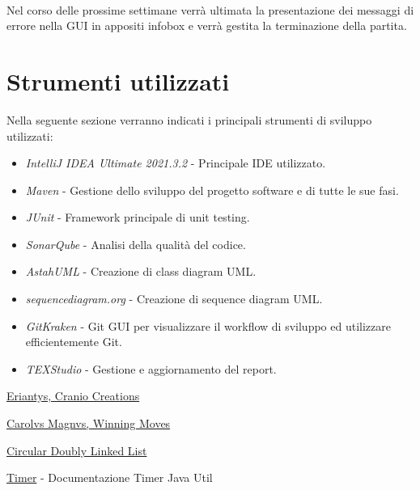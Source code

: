 \documentclass[a4paper, 12pt]{article}
\begin{document}
	\paragraph{}
	Nel corso delle prossime settimane verrà ultimata la presentazione dei messaggi di errore nella GUI in appositi infobox e verrà gestita la terminazione della partita.
	\newpage
	\section{Strumenti utilizzati}
	Nella seguente sezione verranno indicati i principali strumenti di sviluppo utilizzati:\\
	\begin{itemize}
		\setlength{\parskip}{0pt}
		\setlength{\parsep}{0pt}
		
		\item \emph{IntelliJ IDEA Ultimate 2021.3.2} - Principale IDE utilizzato.
		\item \emph{Maven} - Gestione dello sviluppo del progetto software e di tutte le sue fasi.
		\item \emph{JUnit} - Framework principale di unit testing.
		\item \emph{SonarQube} - Analisi della qualità del codice.
		\item \emph{AstahUML} - Creazione di class diagram UML.
		\item \emph{sequencediagram.org} - Creazione di sequence diagram UML.
		\item \emph{GitKraken} - Git GUI per visualizzare il workflow di sviluppo ed utilizzare efficientemente Git.
		\item \emph{TEXStudio} - Gestione e aggiornamento del report.
	\end{itemize}

	\newpage
	\begin{thebibliography}{99}
		\href{https://www.craniocreations.it/prodotto/eriantys/}{Eriantys, Cranio Creations}
		
		\href{https://www.goblins.net/giochi/carolus-magnus-5071}{Carolvs Magnvs, Winning Moves} 
		
		\href{https://www.softwaretestinghelp.com/doubly-linked-list-in-java/#Circular_Doubly_Linked_List_In_Java}{Circular Doubly Linked List}
		
		\href{https://docs.oracle.com/javase/7/docs/api/java/util/Timer.html}{Timer} - Documentazione Timer Java Util
		
	\end{thebibliography} 
\end{document}
